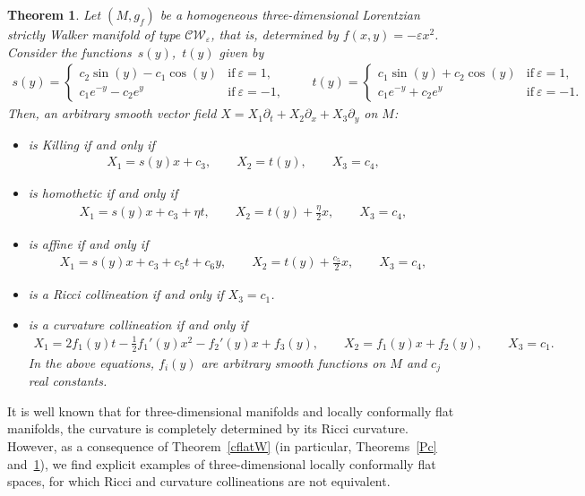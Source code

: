 \documentclass[10pt,a4paper]{amsart}
\numberwithin{equation}{section}
\newtheorem{Theorem}{Theorem}[section]
\begin{document}
\begin{Theorem}\label{CW}
Let $(M,g_f)$ be a homogeneous three-dimensional Lorentzian strictly Walker mani\-fold of type $\mathcal{CW}_\varepsilon$, that is, determined by $f(x,y)=-\varepsilon x^2$. Consider the functions~$s(y)$,~$t(y)$ given by
\begin{gather*}s(y)=
\begin{cases}
c_2\sin(y)-c_1\cos(y) & \text{if} \ \varepsilon=1, \\ c_1e^{-y}-c_2e^{y} & \text{if} \ \varepsilon=-1 ,
\end{cases} \qquad
t(y)=
 \begin{cases}
c_1\sin(y)+c_2\cos(y) & \text{if} \ \varepsilon=1, \\ c_1e^{-y}+c_2e^{y} & \text{if} \ \varepsilon=-1.
\end{cases}
\end{gather*}
Then, an arbitrary smooth vector field $X=X_1\partial_t+X_2\partial_x+X_3\partial_y$ on $M$:
\begin{itemize}\itemsep=0pt
\item is Killing if and only if
\begin{gather*}
X_1=s(y)x+c_3,\qquad X_2=t(y),\qquad X_3=c_4,
\end{gather*}
\item is homothetic if and only if
\begin{gather*}
X_1=s(y)x+c_3+\eta t,\qquad X_2=t(y)+\frac{\eta}{2}x,\qquad X_3=c_4,
\end{gather*}
\item is affine if and only if
\begin{gather*}
X_1= s(y)x+c_3+c_5t+ c_6y,\qquad X_2=t(y)+\frac{c_5}{2}x,\qquad X_3=c_4,
\end{gather*}
\item is a Ricci collineation if and only if $X_3=c_1$.

\item is a curvature collineation if and only if
\begin{gather*}
X_1=2f_1(y)t-\frac12f_1 '(y) x^2-f_2 '(y) x+f_3(y),\qquad X_2=f_1(y)x+f_2(y),\qquad X_3=c_1.
\end{gather*}
In the above {equations, $f_i(y)$ are arbitrary smooth functions on $M$ and $c_j $} real constants.
\end{itemize}
\end{Theorem}

It is well known that for three-dimensional manifolds and locally conformally f\/lat manifolds, the curvature is completely determined by its Ricci curvature. However, as a consequence of Theo\-rem~\ref{cflatW} (in particular, Theorems~\ref{Pc} and~\ref{CW}), we f\/ind explicit examples of {three-dimensional} locally conformally f\/lat spaces, for which Ricci and curvature collineations are not equivalent.
\end{document}
